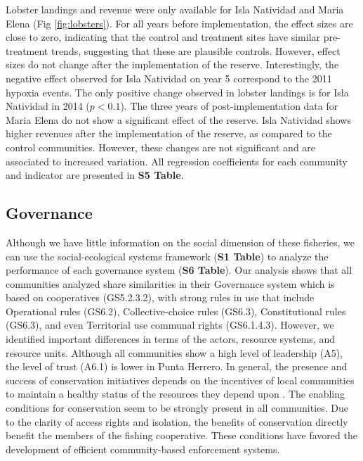 \documentclass{frontiersSCNS}
\begin{document}
Lobster landings and revenue were only available for Isla Natividad and
Maria Elena (Fig \ref{fig:lobsters}). For all years before
implementation, the effect sizes are close to zero, indicating that the
control and treatment sites have similar pre-treatment trends,
suggesting that these are plausible controls. However, effect sizes do
not change after the implementation of the reserve. Interestingly, the
negative effect observed for Isla Natividad on year 5 correspond to the
2011 hypoxia events. The only positive change observed in lobster
landings is for Isla Natividad in 2014 (\(p < 0.1\)). The three years of
post-implementation data for Maria Elena do not show a significant
effect of the reserve. Isla Natividad shows higher revenues after the
implementation of the reserve, as compared to the control communities.
However, these changes are not significant and are associated to
increased variation. All regression coefficients for each community and
indicator are presented in \textbf{S5 Table}.

\subsection{Governance}\label{governance}

Although we have little information on the social dimension of these
fisheries, we can use the social-ecological systems framework
(\textbf{S1 Table}) to analyze the performance of each governance system
(\textbf{S6 Table}). Our analysis shows that all communities analyzed
share similarities in their Governance system which is based on
cooperatives (GS5.2.3.2), with strong rules in use that include
Operational rules (GS6.2), Collective-choice rules (GS6.3),
Constitutional rules (GS6.3), and even Territorial use communal rights
(GS6.1.4.3). However, we identified important differences in terms of
the actors, resource systems, and resource units. Although all
communities show a high level of leadership (A5), the level of trust
(A6.1) is lower in Punta Herrero. In general, the presence and success
of conservation initiatives depends on the incentives of local
communities to maintain a healthy status of the resources they depend
upon \citep{jupiter_2017}. The enabling conditions for conservation seem
to be strongly present in all communities. Due to the clarity of access
rights and isolation, the benefits of conservation directly benefit the
members of the fishing cooperative. These conditions have favored the
development of efficient community-based enforcement systems.
\end{document}
